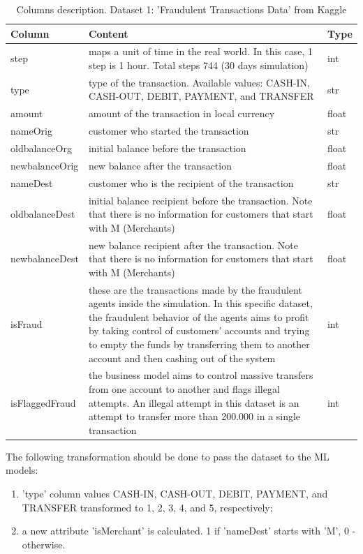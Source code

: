 \documentclass[12pt,a4paper, hidelinks]{article}
\begin{document}
\begin{table}[ht!]
\centering
\begin{tabular}{|p{3cm}|p{9.8cm}|p{2cm}|}
\hline
\textbf{Column} & \textbf{Content} & \textbf{Type} \\
\hline
step & maps a unit of time in the real world. In this case, 1 step is 1 hour. Total steps 744 (30 days simulation) & int \\
\hline
type & type of the transaction. Available values: CASH-IN, CASH-OUT, DEBIT, PAYMENT, and TRANSFER & str \\
\hline
amount & amount of the transaction in local currency & float \\
\hline
nameOrig & customer who started the transaction & str \\
\hline
oldbalanceOrg & initial balance before the transaction & float \\
\hline
newbalanceOrig & new balance after the transaction & float \\
\hline
nameDest & customer who is the recipient of the transaction & str \\
\hline
oldbalanceDest & initial balance recipient before the transaction. Note that there is no information for customers that start with M (Merchants) & float \\
\hline
newbalanceDest & new balance recipient after the transaction. Note that there is no information for customers that start with M (Merchants) & float \\
\hline
isFraud & these are the transactions made by the fraudulent agents inside the simulation. In this specific dataset, the fraudulent behavior of the agents aims to profit by taking control of customers' accounts and trying to empty the funds by transferring them to another account and then cashing out of the system & int \\
\hline
isFlaggedFraud & the business model aims to control massive transfers from one account to another and flags illegal attempts. An illegal attempt in this dataset is an attempt to transfer more than 200.000 in a single transaction & int \\
\hline
\end{tabular}
\caption{Columns description. Dataset 1: 'Fraudulent Transactions Data' from Kaggle}
\end{table}

The following transformation should be done to pass the dataset to the ML models:
\begin{enumerate}
    \item 'type' column values CASH-IN, CASH-OUT, DEBIT, PAYMENT, and TRANSFER transformed to 1, 2, 3, 4, and 5, respectively;
    \item a new attribute 'isMerchant' is calculated. 1 if 'nameDest' starts with 'M', 0 - otherwise.
\end{enumerate}
\end{document}
